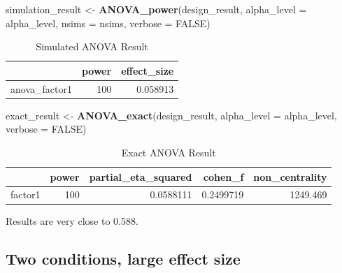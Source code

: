 \documentclass[]{book}
\newenvironment{Shaded}{\begin{snugshade}}{\end{snugshade}}
\newcommand{\DataTypeTok}[1]{\textcolor[rgb]{0.13,0.29,0.53}{#1}}
\newcommand{\KeywordTok}[1]{\textcolor[rgb]{0.13,0.29,0.53}{\textbf{#1}}}
\newcommand{\NormalTok}[1]{#1}
\newcommand{\OtherTok}[1]{\textcolor[rgb]{0.56,0.35,0.01}{#1}}
\newcommand{\StringTok}[1]{\textcolor[rgb]{0.31,0.60,0.02}{#1}}
\begin{document}
\begin{Shaded}
\begin{Highlighting}[]
\NormalTok{simulation_result <-}\StringTok{ }\KeywordTok{ANOVA_power}\NormalTok{(design_result, }
                                 \DataTypeTok{alpha_level =}\NormalTok{ alpha_level, }
                                 \DataTypeTok{nsims =}\NormalTok{ nsims,}
                                 \DataTypeTok{verbose =} \OtherTok{FALSE}\NormalTok{)}
\end{Highlighting}
\end{Shaded}

\begin{table}[!h]

\caption{\label{tab:unnamed-chunk-86}Simulated ANOVA Result}
\centering
\begin{tabular}{l|r|r}
\hline
  & power & effect\_size\\
\hline
anova\_factor1 & 100 & 0.058913\\
\hline
\end{tabular}
\end{table}

\begin{Shaded}
\begin{Highlighting}[]
\NormalTok{exact_result <-}\StringTok{ }\KeywordTok{ANOVA_exact}\NormalTok{(design_result,}
                            \DataTypeTok{alpha_level =}\NormalTok{ alpha_level,}
                            \DataTypeTok{verbose =} \OtherTok{FALSE}\NormalTok{)}
\end{Highlighting}
\end{Shaded}

\begin{table}[!h]

\caption{\label{tab:unnamed-chunk-88}Exact ANOVA Result}
\centering
\begin{tabular}{l|r|r|r|r}
\hline
  & power & partial\_eta\_squared & cohen\_f & non\_centrality\\
\hline
factor1 & 100 & 0.0588111 & 0.2499719 & 1249.469\\
\hline
\end{tabular}
\end{table}

Results are very close to 0.588.

\hypertarget{two-conditions-large-effect-size}{%
\subsection{Two conditions, large effect size}\label{two-conditions-large-effect-size}}
\end{document}
